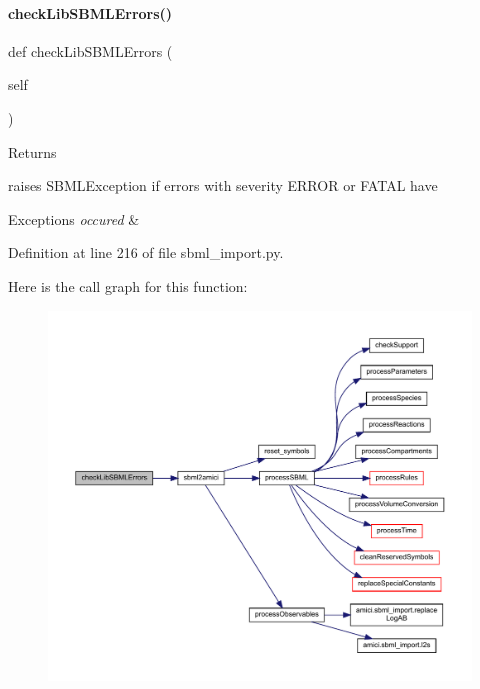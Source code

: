 \paragraph{\texorpdfstring{check\+Lib\+S\+B\+M\+L\+Errors()}{checkLibSBMLErrors()}}
{\footnotesize\ttfamily def check\+Lib\+S\+B\+M\+L\+Errors (\begin{DoxyParamCaption}\item[{}]{self }\end{DoxyParamCaption})}

\begin{DoxyReturn}{Returns}

\end{DoxyReturn}
\begin{DoxyVerb}    raises SBMLException if errors with severity ERROR or FATAL have
\end{DoxyVerb}
 
\begin{DoxyExceptions}{Exceptions}
{\em occured} & \\
\hline
\end{DoxyExceptions}


Definition at line 216 of file sbml\+\_\+import.\+py.

Here is the call graph for this function\+:
\nopagebreak
\begin{figure}[H]
\begin{center}
\leavevmode
\includegraphics[width=350pt]{classamici_1_1sbml__import_1_1_sbml_importer_a0dcfa882a6a14f2d4b83e11552aae318_cgraph}
\end{center}
\end{figure}
\mbox{\label{classamici_1_1sbml__import_1_1_sbml_importer_a83900bb62c0121eb798939a6d4232a9c}} 
